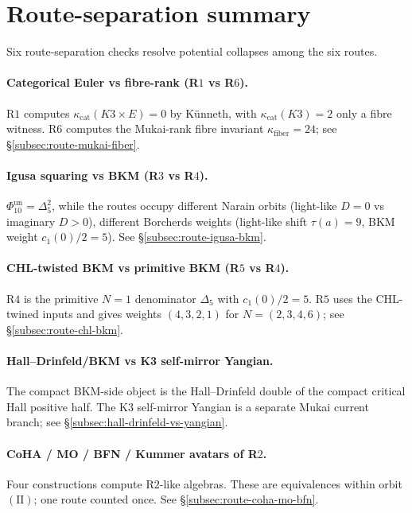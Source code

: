 \documentclass[11pt]{article}
\begin{document}
\appendix

\section{Route-separation summary}

\noindent Six route-separation checks resolve potential collapses
among the six routes.

\paragraph{Categorical Euler vs fibre-rank (R$1$ vs R$6$).}
R$1$ computes $\kappa_{\mathrm{cat}}(K3\times E)=0$ by K\"unneth,
with $\kappa_{\mathrm{cat}}(K3)=2$ only a fibre witness. R$6$
computes the Mukai-rank fibre invariant
$\kappa_{\mathrm{fiber}} = 24$; see \S\ref{subsec:route-mukai-fiber}.

\paragraph{Igusa squaring vs BKM (R$3$ vs R$4$).}
$\Phi_{10}^{\mathrm{un}} = \Delta_5^2$, while the routes occupy different Narain
orbits (light-like $D = 0$
vs imaginary $D > 0$), different Borcherds weights
(light-like shift $\tau(a) = 9$, BKM weight $c_1(0)/2 = 5$).
See \S\ref{subsec:route-igusa-bkm}.

\paragraph{CHL-twisted BKM vs primitive BKM (R$5$ vs R$4$).}
R$4$ is the primitive $N=1$ denominator $\Delta_5$ with
$c_1(0)/2=5$. R$5$ uses the CHL-twined inputs and gives weights
$(4,3,2,1)$ for $N=(2,3,4,6)$;
see \S\ref{subsec:route-chl-bkm}.

\paragraph{Hall--Drinfeld/BKM vs K3 self-mirror Yangian.}
The compact BKM-side object is the Hall--Drinfeld double of the
compact critical Hall positive half. The K3 self-mirror Yangian is a
separate Mukai current branch; see \S\ref{subsec:hall-drinfeld-vs-yangian}.

\paragraph{CoHA / MO / BFN / Kummer avatars of R$2$.}
Four constructions compute R$2$-like algebras. These are equivalences within
orbit $(\mathrm{II})$; one route
counted once. See \S\ref{subsec:route-coha-mo-bfn}.
\end{document}
